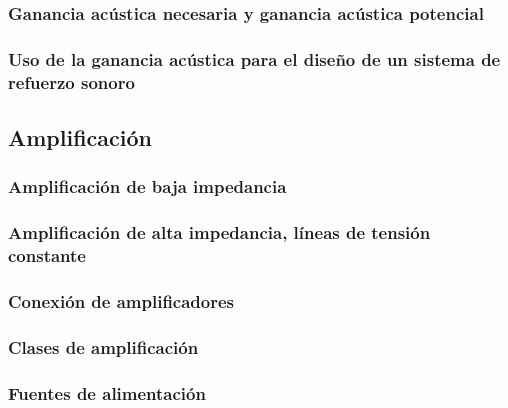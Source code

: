 \documentclass[a4paper, 8pt]{extarticle}
\begin{document}
\begin{multicols}{3}
  \subsubsection{Ganancia acústica necesaria y ganancia acústica potencial}
  \subsubsection{Uso de la ganancia acústica para el diseño de un sistema de refuerzo sonoro}
  \subsection{Amplificación}
  \subsubsection{Amplificación de baja impedancia}
  \subsubsection{Amplificación de alta impedancia, líneas de tensión constante}
  \subsubsection{Conexión de amplificadores}
  \subsubsection{Clases de amplificación}
  \subsubsection{Fuentes de alimentación}

\end{multicols}
\end{document}
